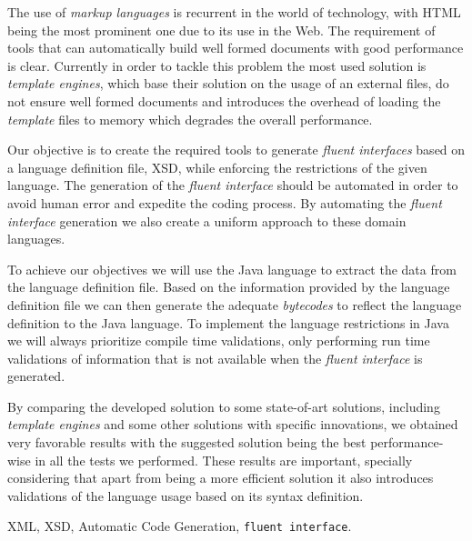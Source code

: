 \abstractEN %

The use of \textit{markup languages} is recurrent in the world of technology, with \ac{HTML} being the most prominent one due to its use in the Web. The requirement of tools that can automatically build well formed documents with good performance is clear. Currently in order to tackle this problem the most used solution is \textit{template engines}, which base their solution on the usage of an external files, do not ensure well formed documents and introduces the overhead of loading the \textit{template} files to memory which degrades the overall performance.

\noindent
Our objective is to create the required tools to generate \textit{fluent interfaces} based on a language definition file, \ac{XSD}, while enforcing the restrictions of the given language. The generation of the \textit{fluent interface} should be automated in order to avoid human error and expedite the coding process. By automating the \textit{fluent interface} generation we also create a uniform approach to these domain languages.  

\noindent
To achieve our objectives we will use the Java language to extract the data from the language definition file. Based on the information provided by the language definition file we can then generate the adequate \textit{bytecodes} to reflect the language definition to the Java language. To implement the language restrictions in Java we will always prioritize compile time validations, only performing run time validations of information that is not available when the \textit{fluent interface} is generated.

\noindent
By comparing the developed solution to some state-of-art solutions, including \textit{template engines} and some other solutions with specific innovations, we obtained very favorable results with the suggested solution being the best performance-wise in all the tests we performed. These results are important, specially considering that apart from being a more efficient solution it also introduces validations of the language usage based on its syntax definition.

\begin{keywords}
XML, XSD, Automatic Code Generation, \texttt{fluent interface}.
\end{keywords} 
